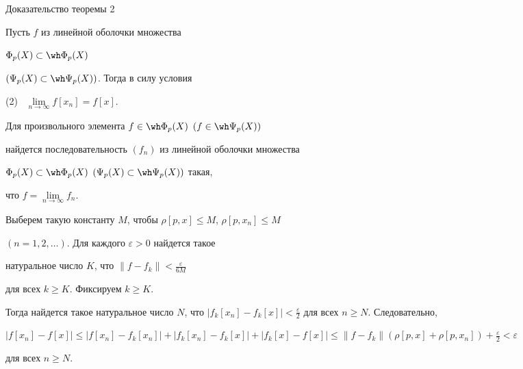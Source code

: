 




\begin{pf*}{Доказательство теоремы 2}


Пусть $f$ из линейной оболочки множества 


$\Phi_{p}(X) \subset \wh \Phi_{p}(X)$


$(\Psi_{p}(X) \subset \wh \Psi_{p}(X))$. Тогда в силу условия


(2) \ $\lim \limits_{n\rightarrow \infty }{f[x_{n}]} = f[x]$.


Для произвольного элемента $f \in \wh \Phi_{p}(X)$ $(f\in\wh\Psi_{p}(X))$


найдется последовательность $(f_{n})$ из линейной оболочки множества


$\Phi_{p}(X) \subset \wh \Phi_{p}(X)$ $(\Psi_{p}(X) \subset


\wh \Psi_{p}(X))$ такая,


что $f = \lim \limits_{n\rightarrow \infty}{f_{n}}$.


Выберем такую константу $M$, чтобы $\rho[p,x] \le M$, $\rho[p,x_{n}]\le M$


$(n =1,2,\dotsc)$. Для каждого $\varepsilon > 0$ найдется такое 


натуральное число $K$, что $\|f - f_{k}\| < \frac{\varepsilon}{6M}$


для всех $k \geq K$. Фиксируем  $k \geq K$.


Тогда найдется такое натуральное число $N$, что $|f_{k}[x_{n}]-f_{k}[x]| <


\frac{\varepsilon}{2}$ для всех $n \geq N$. Следовательно,


$|f[x_{n}] - f[x]| \leq |f[x_{n}] - f_{k}[x_{n}]| +|f_{k}[x_{n}] -


f_{k}[x]| + |f_{k}[x] - f[x]| \leq


\|f-f_{k}\|(\rho[p,x]+\rho[p,x_{n}])+\frac{\varepsilon}{2} < \varepsilon$ 


для всех $n \geq N$.


\end{pf*}





